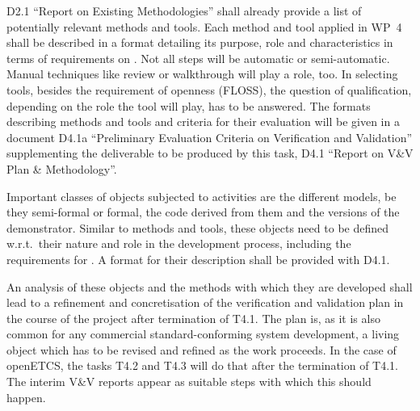D2.1 ``Report on Existing Methodologies'' shall already provide a list
of potentially relevant methods and tools. Each method and tool
applied in WP~4 shall be described in a format detailing its purpose,
role and characteristics in terms of requirements on \vv.  Not all
steps will be automatic or semi-automatic. Manual techniques
like review or walkthrough will play a role, too. In selecting tools,
besides the requirement of openness (FLOSS), the question of
qualification, depending on the role the tool will play, has to be
answered. The formats describing methods and tools and criteria for
their evaluation will be given in a document D4.1a ``Preliminary
Evaluation Criteria on Verification and Validation'' supplementing the
deliverable to be produced by this task, D4.1 ``Report on V\&V Plan \&
Methodology''. 

Important classes of objects subjected to \vv activities are the
different models, be they semi-formal or formal, the code derived from
them and the versions of the demonstrator. Similar to methods and
tools, these objects need to be defined w.r.t.\ their nature and role
in the development process, including the requirements for \vv. A
format for their description shall be provided with D4.1.

An analysis of these objects and the methods with which they are
developed shall lead to a refinement and concretisation of the
verification and validation plan in the course of the project after
termination of T4.1. The plan is, as it is also common for any commercial
standard-conforming system development, a living object which has to
be revised and refined as the work proceeds. In the case of openETCS,
the tasks T4.2 and T4.3 will do that after the termination of
T4.1. The interim V\&V reports appear as suitable steps with which
this should happen. 


